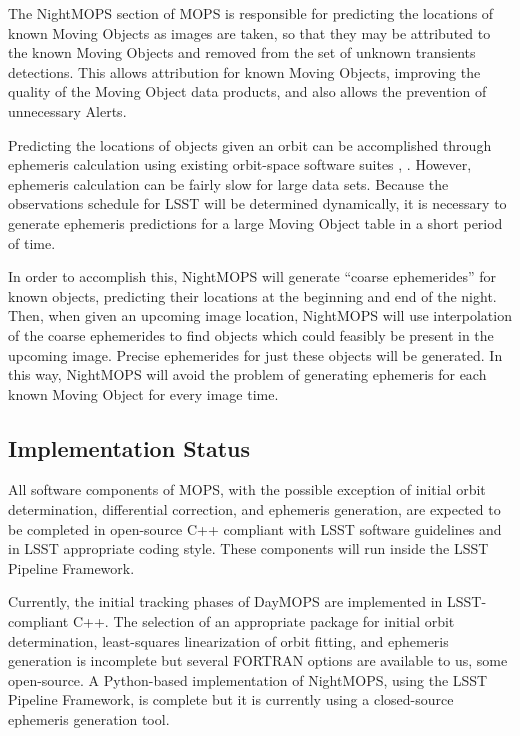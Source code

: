 \documentclass[12pt,preprint]{aastex}
\begin{document}
The NightMOPS section of MOPS is responsible for predicting the
locations of known Moving Objects as images are taken, so that they
may be attributed to the known Moving Objects and removed from the set
of unknown transients detections.  This allows attribution for known
Moving Objects, improving the quality of the Moving Object data
products, and also allows the prevention of unnecessary Alerts.

Predicting the locations of objects given an orbit can be accomplished
through ephemeris calculation using existing orbit-space software
suites \citep{Milani2006}, \citep{OpenOrb2009}.  However, ephemeris
calculation can be fairly slow for large data sets.  Because the
observations schedule for LSST will be determined dynamically, it is
necessary to generate ephemeris predictions for a large Moving Object
table in a short period of time.


In order to accomplish this, NightMOPS will generate ``coarse
ephemerides'' for known objects, predicting their locations at the
beginning and end of the night.  Then, when given an upcoming image
location, NightMOPS will use interpolation of the coarse ephemerides
to find objects which could feasibly be present in the upcoming
image. Precise ephemerides for just these objects will be
generated. In this way, NightMOPS will avoid the problem of generating
ephemeris for each known Moving Object for every image time.


\subsection{Implementation Status}

All software components of MOPS, with the possible exception of
initial orbit determination, differential correction, and ephemeris
generation, are expected to be completed in open-source C++ compliant
with LSST software guidelines and in LSST appropriate coding style.
These components will run inside the LSST Pipeline Framework.

Currently, the initial tracking phases of DayMOPS are implemented in
LSST-compliant C++.  The selection of an appropriate package for
initial orbit determination, least-squares linearization of orbit
fitting, and ephemeris generation is incomplete but several FORTRAN
options are available to us, some open-source.  A Python-based
implementation of NightMOPS, using the LSST Pipeline Framework, is
complete but it is currently using a closed-source ephemeris
generation tool.
\end{document}
